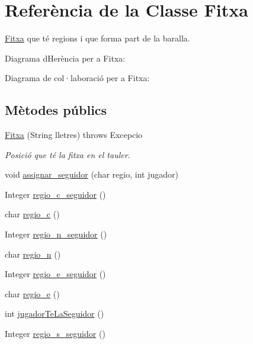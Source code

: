 \hypertarget{class_fitxa}{}\section{Referència de la Classe Fitxa}
\label{class_fitxa}


\mbox{\hyperlink{class_fitxa}{Fitxa}} que té regions i que forma part de la baralla.  




Diagrama d\textquotesingle{}Herència per a Fitxa\+:


Diagrama de col·laboració per a Fitxa\+:
\subsection*{Mètodes públics}
\begin{DoxyCompactItemize}
\item 
\mbox{\hyperlink{class_fitxa_a053ca7bf82da62ef589a1ef08aa835a3}{Fitxa}} (String lletres)  throws Excepcio
\begin{DoxyCompactList}\small\item\em Posició que té la fitxa en el tauler. \end{DoxyCompactList}\item 
void \mbox{\hyperlink{class_fitxa_aada7b61d86ed4703252c9a9d3ea9ce1d}{assignar\+\_\+seguidor}} (char regio, int jugador)
\item 
Integer \mbox{\hyperlink{class_fitxa_a37104d196a82d324bedaa4a9294758bc}{regio\+\_\+c\+\_\+seguidor}} ()
\item 
char \mbox{\hyperlink{class_fitxa_a7cc0281785388d498da748080c42083e}{regio\+\_\+c}} ()
\item 
Integer \mbox{\hyperlink{class_fitxa_a280bc89f067a6aafd918064caf88333a}{regio\+\_\+n\+\_\+seguidor}} ()
\item 
char \mbox{\hyperlink{class_fitxa_a624bc5406355ecd57d98a8f88b919d7d}{regio\+\_\+n}} ()
\item 
Integer \mbox{\hyperlink{class_fitxa_a96ca7466a7c6f305f08b5ee139cd3d6d}{regio\+\_\+e\+\_\+seguidor}} ()
\item 
char \mbox{\hyperlink{class_fitxa_a929a959f9c3d8f263a44763f404c1f0d}{regio\+\_\+e}} ()
\item 
int \mbox{\hyperlink{class_fitxa_a408b3191cfdbde147edea3ec0254c44d}{jugador\+Te\+La\+Seguidor}} ()
\item 
Integer \mbox{\hyperlink{class_fitxa_aefba843b22263005650f44992144ff53}{regio\+\_\+s\+\_\+seguidor}} ()
\item 

\end{DoxyCompactItemize}
